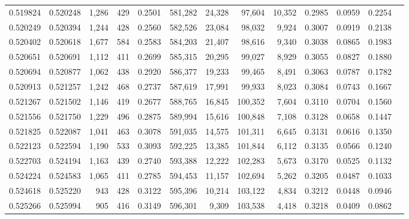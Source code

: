 \begin{tabular}{rrrrrrrrrrrrr}
0.519824 & 0.520248 & 1,286 &   429 &                                     0.2501 & 581,282 &  24,328 &  97,604 &  10,352 & 0.2985 & 0.0959 & 0.2254 \\
0.520249 & 0.520394 & 1,244 &   428 &                                     0.2560 & 582,526 &  23,084 &  98,032 &   9,924 & 0.3007 & 0.0919 & 0.2138 \\
0.520402 & 0.520618 & 1,677 &   584 &                                     0.2583 & 584,203 &  21,407 &  98,616 &   9,340 & 0.3038 & 0.0865 & 0.1983 \\
0.520651 & 0.520691 & 1,112 &   411 &                                     0.2699 & 585,315 &  20,295 &  99,027 &   8,929 & 0.3055 & 0.0827 & 0.1880 \\
0.520694 & 0.520877 & 1,062 &   438 &                                     0.2920 & 586,377 &  19,233 &  99,465 &   8,491 & 0.3063 & 0.0787 & 0.1782 \\
0.520913 & 0.521257 & 1,242 &   468 &                                     0.2737 & 587,619 &  17,991 &  99,933 &   8,023 & 0.3084 & 0.0743 & 0.1667 \\
0.521267 & 0.521502 & 1,146 &   419 &                                     0.2677 & 588,765 &  16,845 & 100,352 &   7,604 & 0.3110 & 0.0704 & 0.1560 \\
0.521556 & 0.521750 & 1,229 &   496 &                                     0.2875 & 589,994 &  15,616 & 100,848 &   7,108 & 0.3128 & 0.0658 & 0.1447 \\
0.521825 & 0.522087 & 1,041 &   463 &                                     0.3078 & 591,035 &  14,575 & 101,311 &   6,645 & 0.3131 & 0.0616 & 0.1350 \\
0.522123 & 0.522594 & 1,190 &   533 &                                     0.3093 & 592,225 &  13,385 & 101,844 &   6,112 & 0.3135 & 0.0566 & 0.1240 \\
0.522703 & 0.524194 & 1,163 &   439 &                                     0.2740 & 593,388 &  12,222 & 102,283 &   5,673 & 0.3170 & 0.0525 & 0.1132 \\
0.524224 & 0.524583 & 1,065 &   411 &                                     0.2785 & 594,453 &  11,157 & 102,694 &   5,262 & 0.3205 & 0.0487 & 0.1033 \\
0.524618 & 0.525220 &   943 &   428 &                                     0.3122 & 595,396 &  10,214 & 103,122 &   4,834 & 0.3212 & 0.0448 & 0.0946 \\
0.525266 & 0.525994 &   905 &   416 &                                     0.3149 & 596,301 &   9,309 & 103,538 &   4,418 & 0.3218 & 0.0409 & 0.0862 \\

\end{tabular}
